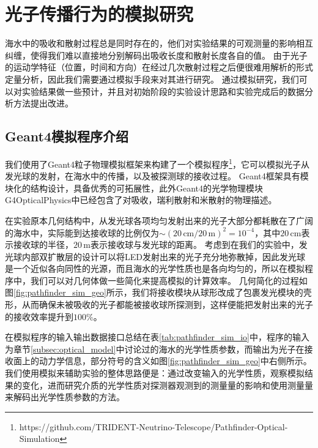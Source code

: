 \section{光子传播行为的模拟研究}
\label{sec:pathfinder_sim}

海水中的吸收和散射过程总是同时存在的，他们对实验结果的可观测量的影响相互纠缠，使得我们难以直接地分别解码出吸收长度和散射长度各自的值。
由于光子的运动学特征（位置，时间和方向）在经过几次散射过程之后便很难用解析的形式定量分析，因此我们需要通过模拟手段来对其进行研究\cite{pathfinder_simulation:2022}。
通过模拟研究，我们可以对实验结果做一些预计，并且对初始阶段的实验设计思路和实验完成后的数据分析方法提出改进。

\subsection{Geant4模拟程序介绍}

我们使用了\textsf{Geant4}粒子物理模拟框架来构建了一个模拟程序\footnote{https://github.com/TRIDENT-Neutrino-Telescope/Pathfinder-Optical-Simulation}，它可以模拟光子从发光球的发射，在海水中的传播，以及被探测球的接收过程。
\textsf{Geant4}框架具有模块化的结构设计，具备优秀的可拓展性，此外\textsf{Geant4}的光学物理模块\textsf{G4OpticalPhysics}中已经包含了对吸收，瑞利散射和米散射的物理描述。

在实验原本几何结构中，从发光球各项均匀发射出来的光子大部分都耗散在了广阔的海水中，实际能到达接收球的比例仅为$\sim (20\,\mathrm{cm} / 20\,\mathrm{m})^2 =10^{-4}$，其中$20\,\mathrm{cm}$表示接收球的半径，$20\,\mathrm{m}$表示接收球与发光球的距离。
考虑到在我们的实验中，发光球内部双扩散层的设计可以将LED发射出来的光子充分地弥散掉，因此发光球是一个近似各向同性的光源，而且海水的光学性质也是各向均匀的，所以在模拟程序中，我们可以对几何体做一些简化来提高模拟的计算效率。
几何简化的过程如图\ref{fig:pathfinder_sim_geo}所示，我们将接收模块从球形改成了包裹发光模块的壳形，从而确保未被吸收的光子都能被接收球所探测到，这样便能把发射出来的光子的接收效率提升到$100\%$。

在模拟程序的输入输出数据接口总结在表\ref{tab:pathfinder_sim_io}中，程序的输入为章节\ref{subsec:optical_model}中讨论过的海水的光学性质参数，而输出为光子在接收面上的动力学信息，部分符号的含义如图\ref{fig:pathfinder_sim_geo}中右侧所示。
我们使用模拟来辅助实验的整体思路便是：通过改变输入的光学性质，观察模拟结果的变化，进而研究介质的光学性质对探测器观测到的测量量的影响和使用测量量来解码出光学性质参数的方法。

